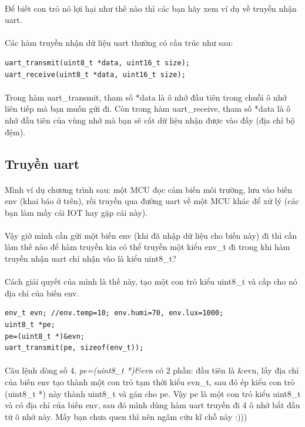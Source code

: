 \documentclass[12pt,a5paper]{book}
\begin{document}
\paragraph{}
Để biết con trỏ nó lợi hại như thế nào thì các bạn hãy xem ví dụ về truyền nhận uart.
\paragraph{}
Các hàm truyền nhận dữ liệu uart thường có cấu trúc như sau:
\begin{lstlisting}
uart_transmit(uint8_t *data, uint16_t size);
uart_receive(uint8_t *data, uint16_t size);
\end{lstlisting}
\paragraph{}
Trong hàm uart\_transmit, tham số *data là ô nhớ đầu tiên trong chuỗi ô nhớ liên tiếp mà bạn muốn gửi đi. Còn trong hàm uart\_receive, tham số *data là ô nhớ đầu tiên của vùng nhớ mà bạn sẽ cất dữ liệu nhận được vào đấy (địa chỉ bộ đệm).
\subsection{Truyền uart}
\paragraph{}
Mình ví dụ chương trình sau: một MCU đọc cảm biến môi trường, lưu vào biến env (khai báo ở trên), rồi truyền qua đường uart về một MCU khác để xử lý (các bạn làm mấy cái IOT hay gặp cái này).

\paragraph{}
Vậy giờ mình cần gửi một biến env (khi đã nhập dữ liệu cho biến này) đi thì cần làm thế nào để hàm truyền kia có thể truyền một kiểu env\_t đi trong khi hàm truyền nhận uart chỉ nhận vào là kiểu uint8\_t?
\paragraph{}
Cách giải quyết của mình là thế này, tạo một con trỏ kiểu uint8\_t và cấp cho nó địa chỉ của biến env.
\begin{lstlisting}
env_t evn; //env.temp=10; env.humi=70, env.lux=1000;
uint8_t *pe;
pe=(uint8_t *)&evn;
uart_transmit(pe, sizeof(env_t));
\end{lstlisting}
\paragraph{}
Câu lệnh dòng số 4, \textit{pe=(uint8\_t *)\&evn} có 2 phần: đầu tiên là \&evn, lấy địa chỉ của biến env tạo thành một con trỏ tạm thời kiểu evn\_t, sau đó ép kiểu con trỏ (uint8\_t *) này thành uint8\_t và gán cho pe. Vậy pe là một con trỏ kiểu uint8\_t và có địa chỉ của biến env, sau đó mình dùng hàm uart truyền đi 4 ô nhớ bắt đầu từ ô nhớ này. Mấy bạn chưa quen thì nên ngâm cứu kĩ chỗ này :)))
\end{document}

